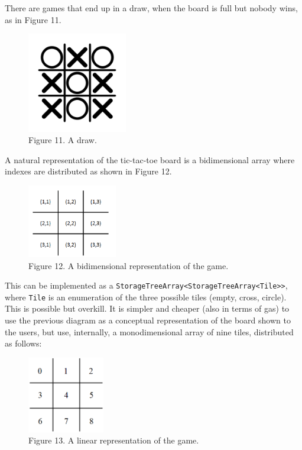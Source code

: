 \documentclass[a4paper,]{book}
\begin{document}
{There are games that end up in a draw, when the board is full but nobody
wins, as in Figure 11.

\begin{figure}
\centering
\includegraphics[width=0.39\textwidth,height=\textheight]{pics/tictactoe_draw.png}
\caption{Figure 11. A draw.}
\end{figure}

A natural representation of the tic-tac-toe board is a bidimensional
array where indexes are distributed as shown in Figure 12.

\begin{figure}
\centering
\includegraphics[width=0.35\textwidth,height=\textheight]{pics/tictactoe_grid.png}
\caption{Figure 12. A bidimensional representation of the game.}
\end{figure}

This can be implemented as a
\texttt{StorageTreeArray\textless{}StorageTreeArray\textless{}Tile\textgreater{}\textgreater{}},
where \texttt{Tile} is an enumeration of the three possible tiles
(empty, cross, circle). This is possible but overkill. It is simpler and
cheaper (also in terms of gas) to use the previous diagram as a
conceptual representation of the board shown to the users, but use,
internally, a monodimensional array of nine tiles, distributed as
follows:

\begin{figure}
\centering
\includegraphics[width=0.3\textwidth,height=\textheight]{pics/tictactoe_grid_linear.png}
\caption{Figure 13. A linear representation of the game.}
\end{figure}

}
\end{document}
